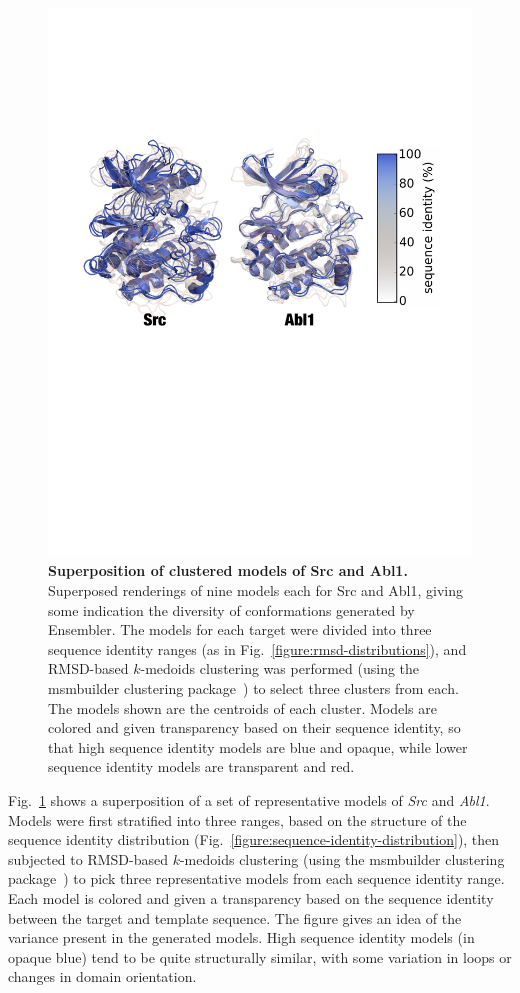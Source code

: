 \documentclass[aps,prl,preprint,nofootinbib,superscriptaddress,linenumbers]{revtex4-1}
\begin{document}
\begin{figure}[tb]
    \includegraphics[width=0.8\columnwidth]{superposition-src_abl/superposed-seqid_classes-clustered-one_fig}
    
    \caption{\footnotesize {\bf Superposition of clustered models of Src and Abl1.}
    Superposed renderings of nine models each for Src and Abl1, 
    giving some indication the diversity of conformations generated by Ensembler.
    The models for each target were divided into three sequence identity ranges (as in Fig.~\ref{figure:rmsd-distributions}), and RMSD-based $k$-medoids clustering was performed (using the msmbuilder clustering package~\cite{msmbuilder}) to select three clusters from each.
    The models shown are the centroids of each cluster.
    Models are colored and given transparency based on their sequence identity, so that high sequence identity models are blue and opaque, while lower sequence identity models are transparent and red.
  }
  \label{figure:superposition}
\end{figure}

Fig.~\ref{figure:superposition} shows a superposition of a set of representative models of \emph{Src} and \emph{Abl1}.
Models were first stratified into three ranges, based on the structure of the sequence identity distribution (Fig.~\ref{figure:sequence-identity-distribution}), then subjected to RMSD-based $k$-medoids clustering (using the msmbuilder clustering package~\cite{msmbuilder}) to pick three representative models from each sequence identity range.
Each model is colored and given a transparency based on the sequence identity between the target and template sequence.
The figure gives an idea of the variance present in the generated models.
High sequence identity models (in opaque blue) tend to be quite structurally similar, with some variation in loops or changes in domain orientation.
\end{document}
